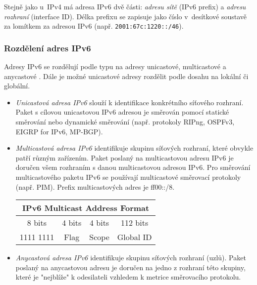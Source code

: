 Stejně jako u~IPv4 má adresa IPv6 dvě části: \emph{adresu sítě} (IPv6 prefix) a
\emph{adresu rozhraní} (interface ID). Délka prefixu se zapisuje jako číslo v~desítkové soustavě za lomítkem za adresou IPv6 (např. {\tt 2001:67c:1220::/46}).

\subsubsection{Rozdělení adres IPv6}
Adresy IPv6 se rozdělují podle typu na adresy unicastové, multicastové a anycastové \cite{rfc4291}. Dále je možné unicastové adresy rozdělit podle dosahu na lokální či globální.

\begin{itemize}
  \item {\em Unicastová adresa IPv6} slouží k identifikace konkrétního síťového rozhraní. Paket s cílovou unicastovou IPv6 adresou je směrován pomocí statické směrování nebo dynamické směrování (např. protokoly RIPng, OSPFv3, EIGRP for IPv6, MP-BGP).
  \item {\em Multicastová adresa IPv6} identifikuje skupinu síťových rozhraní, které obvykle patří různým zařízením. Paket poslaný na multicastovou adresu IPv6 je doručen všem rozhraním s danou multicastovou adresou IPv6. Pro směrování multicastového paketu IPv6 se používají multicastové směrovací protokoly (např. PIM). Prefix multicastových adres je ff00::/8.

    \begin{table}[h]
      \begin{center}
        \begin{tabular}{|c|c|c|c|}
          \multicolumn{4}{c}{IPv6 Multicast Address Format}\\
          \hline
          8 bits & 4 bits &  4 bits  &  112 bits \\
          \hline
          1111 1111 & Flag & Scope & Global ID \\
          \hline
        \end{tabular}
      \end{center}
    \end{table}


  \item {\em Anycastová adresa IPv6} identifikuje skupinu síťových rozhraní (uzlů). Paket poslaný na anycastovou adresu je doručen na jedno z rozhraní této skupiny, které je "nejblíže" k odesilateli vzhledem k metrice směrovacího protokolu.
\end{itemize}

